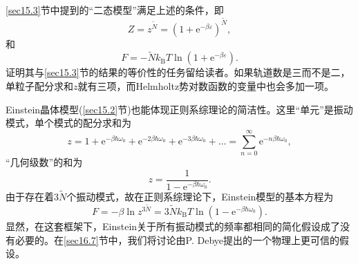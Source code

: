 \ref{sec15.3}节中提到的“二态模型”满足上述的条件，即
\begin{equation}
Z = z^{\tilde N}= (1+\mathrm e^{-\beta\varepsilon})^{\tilde N},
\end{equation}
和
\begin{equation}
F = -\tilde Nk_\text{B}T\ln(1+\mathrm e^{-\beta\varepsilon}).
\label{equ16.21}
\end{equation}
证明其与\ref{sec15.3}节的结果的等价性的任务留给读者。如果轨道数是三而不是二，单粒子配分求和$z$就有三项，而Helmholtz势对数函数的变量中也会多加一项。

Einstein晶体模型(\ref{sec15.2}节)也能体现正则系综理论的简洁性。这里“单元”是振动模式，单个模式的配分求和为
\begin{equation}
z = 1 + \mathrm e^{-\beta\hbar\omega_0} + \mathrm e^{-2\beta\hbar\omega_0} + \mathrm e^{-3\beta\hbar\omega_0} + \dots = \sum\limits_{n=0}^{\infty} \mathrm e^{-n\beta\hbar\omega_0},
\label{equ16.22}
\end{equation}
“几何级数”的和为
\begin{equation}
z = \frac{1}{1-\mathrm e^{-\beta\hbar\omega_0}}.
\label{equ16.23}
\end{equation}
由于存在着$3\tilde N$个振动模式，故在正则系综理论下，Einstein模型的基本方程为
\begin{equation}
F = -\beta\ln z^{3\tilde N}=3\tilde Nk_\text{B}T\ln(1-\mathrm e^{-\beta\hbar\omega_0}).
\label{equ16.24}
\end{equation}
显然，在这套框架下，Einstein关于所有振动模式的频率都相同的简化假设成了没有必要的。在\ref{sec16.7}节中，我们将讨论由P. Debye提出的一个物理上更可信的假设。


